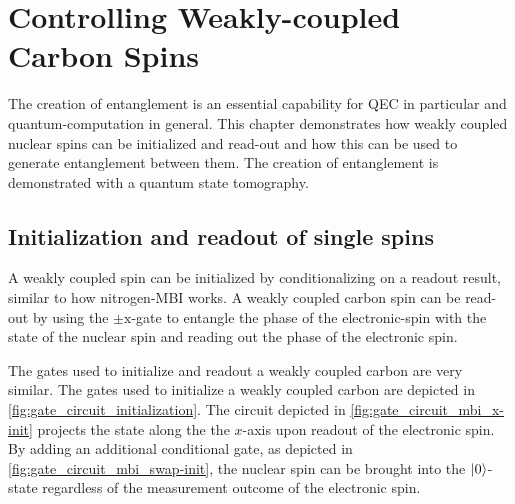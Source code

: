 \chapter{Controlling Weakly-coupled Carbon Spins}
\label{chap:control_weakly_carbon}
The creation of entanglement is an essential capability for QEC in particular and quantum-computation in general.
This chapter demonstrates how weakly coupled nuclear spins can be initialized and read-out and how this can be used to generate entanglement between them.
The creation of entanglement is demonstrated with a quantum state tomography.

\section{Initialization and readout of single spins}
\label{sec:carbon_init_and_readout}
A weakly coupled spin can be initialized by conditionalizing on a readout result, similar to how nitrogen-MBI works.
A weakly coupled carbon spin can be read-out by using the $\pm \mathrm{x}$-gate to entangle the phase of the electronic-spin with the state of the nuclear spin and reading out the phase of the electronic spin.

The gates used to initialize and readout a weakly coupled carbon are very similar.
The gates used to initialize a weakly coupled carbon are depicted in \cref{fig:gate_circuit_initialization}.
The circuit depicted in \cref{fig:gate_circuit_mbi_x-init} projects the state along the the $x$-axis upon readout of the electronic spin.
By adding an additional conditional gate, as depicted in \cref{fig:gate_circuit_mbi_swap-init}, the nuclear spin can be brought into the ${\left\vert{0}\right\rangle}$-state regardless of the measurement outcome of the electronic spin.

